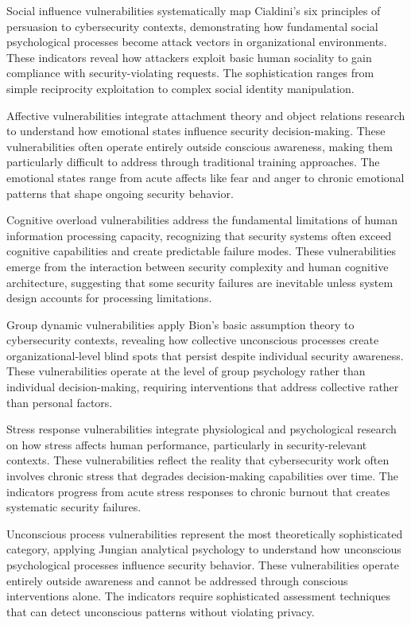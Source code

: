 \documentclass[11pt,a4paper]{article}
\begin{document}
Social influence vulnerabilities systematically map Cialdini's six principles of persuasion to cybersecurity contexts\cite{cialdini2007}, demonstrating how fundamental social psychological processes become attack vectors in organizational environments. These indicators reveal how attackers exploit basic human sociality to gain compliance with security-violating requests. The sophistication ranges from simple reciprocity exploitation to complex social identity manipulation.

Affective vulnerabilities integrate attachment theory and object relations research to understand how emotional states influence security decision-making\cite{klein1946, bowlby1969}. These vulnerabilities often operate entirely outside conscious awareness, making them particularly difficult to address through traditional training approaches. The emotional states range from acute affects like fear and anger to chronic emotional patterns that shape ongoing security behavior.

Cognitive overload vulnerabilities address the fundamental limitations of human information processing capacity\cite{miller1956}, recognizing that security systems often exceed cognitive capabilities and create predictable failure modes. These vulnerabilities emerge from the interaction between security complexity and human cognitive architecture, suggesting that some security failures are inevitable unless system design accounts for processing limitations.

Group dynamic vulnerabilities apply Bion's basic assumption theory to cybersecurity contexts\cite{bion1961}, revealing how collective unconscious processes create organizational-level blind spots that persist despite individual security awareness. These vulnerabilities operate at the level of group psychology rather than individual decision-making, requiring interventions that address collective rather than personal factors.

Stress response vulnerabilities integrate physiological and psychological research on how stress affects human performance, particularly in security-relevant contexts\cite{selye1956}. These vulnerabilities reflect the reality that cybersecurity work often involves chronic stress that degrades decision-making capabilities over time. The indicators progress from acute stress responses to chronic burnout that creates systematic security failures.

Unconscious process vulnerabilities represent the most theoretically sophisticated category, applying Jungian analytical psychology to understand how unconscious psychological processes influence security behavior\cite{jung1969}. These vulnerabilities operate entirely outside awareness and cannot be addressed through conscious interventions alone. The indicators require sophisticated assessment techniques that can detect unconscious patterns without violating privacy.
\end{document}
